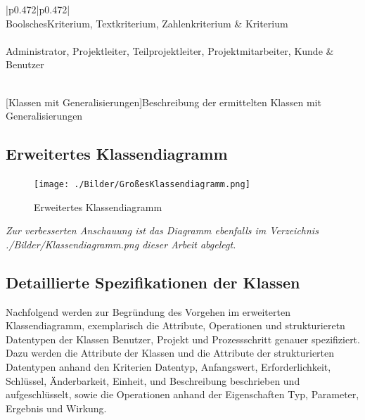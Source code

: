 \begin{xltabular}{\textwidth}{|p{0.472\textwidth}|p{0.472\textwidth}|}
    \hline
    \\\hline\hline
    BoolschesKriterium, Textkriterium, Zahlenkriterium & Kriterium \\\hline
    \\\hline\hline
    Administrator, Projektleiter, Teilprojektleiter, Projektmitarbeiter, Kunde & Benutzer \\\hline
    \\\hline
\end{xltabular}
[Klassen mit Generalisierungen]{Beschreibung der ermittelten Klassen mit Generalisierungen}
\newpage
\subsection{Erweitertes Klassendiagramm}
\begin{figure}[h!]
    \centering
    \texttt{[image: ./Bilder/GroßesKlassendiagramm.png]}
    \caption[Erweitertes Klassendiagramm]{Erweitertes Klassendiagramm}
    \label{fig:Klassendiagramm}
\end{figure}
\emph{Zur verbesserten Anschauung ist das Diagramm ebenfalls im Verzeichnis ./Bilder/Klassendiagramm.png dieser Arbeit abgelegt.}
\newpage
\subsection{Detaillierte Spezifikationen der Klassen}
Nachfolgend werden zur Begründung des Vorgehen im erweiterten Klassendiagramm, exemplarisch die Attribute, Operationen und strukturieretn Datentypen der Klassen Benutzer, Projekt und Prozessschritt genauer spezifiziert. Dazu werden die Attribute der Klassen und die Attribute der strukturierten Datentypen anhand den Kriterien \glqq{}Datentyp\grqq{}, \glqq{}Anfangswert\grqq{}, \glqq{}Erforderlichkeit\grqq{}, \glqq{}Schlüssel\grqq{}, \glqq{}Änderbarkeit\grqq{}, \glqq{}Einheit\grqq{}, und \glqq{}Beschreibung\grqq{} beschrieben und aufgeschlüsselt, sowie die Operationen anhand der Eigenschaften \glqq{}Typ\grqq{}, \glqq{}Parameter\grqq{}, \glqq{}Ergebnis\grqq{} und \glqq{}Wirkung\grqq{}. 

